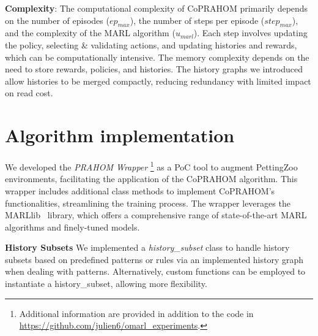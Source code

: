 \documentclass[conference]{IEEEtran}
\begin{document}
\textbf{Complexity}: \quad The computational complexity of CoPRAHOM primarily depends on the number of episodes ($ep_{max}$), the number of steps per episode ($step_{max}$), and the complexity of the MARL algorithm ($u_{marl}$). Each step involves updating the policy, selecting \& validating actions, and updating histories and rewards, which can be computationally intensive. The memory complexity depends on the need to store rewards, policies, and histories. The history graphs we introduced allow histories to be merged compactly, reducing redundancy with limited impact on read cost.



\section{Algorithm implementation}\label{sec:prahom_wrapper}

We developed the \textit{PRAHOM Wrapper}
%
\footnote{Additional information are provided in addition to the code in \url{https://github.com/julien6/omarl_experiments}.}
%
as a PoC tool to augment PettingZoo environments, facilitating the application of the CoPRAHOM algorithm. This wrapper includes additional class methods to implement CoPRAHOM's functionalities, streamlining the training process. The wrapper leverages the MARLlib~\cite{hu2022marllib} library, which offers a comprehensive range of state-of-the-art MARL algorithms and finely-tuned models.

\textbf{History Subsets} \quad We implemented a \textit{history\_subset} class to handle history subsets based on predefined patterns or rules via an implemented history graph when dealing with patterns. Alternatively, custom functions can be employed to instantiate a history\_subset, allowing more flexibility.
\end{document}
